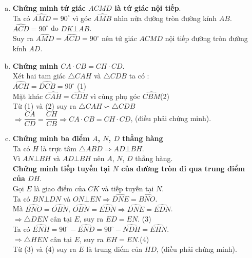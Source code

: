 \begin{ex}
{\begin{center}
		\end{center}
\begin{enumerate}[a)]
	\item \textbf{Chứng minh tứ giác $ACMD$ là tứ giác nội tiếp}.\\
	Ta có $ \widehat{AMD}= 90^\circ$ vì góc $\widehat{AMB}$ nhìn nửa đường tròn đường kính $AB$.\\
	$\widehat{ACD}=90^\circ$ do $DK \bot AB$.\\
	Suy ra $\widehat{AMD}=\widehat{ACD}=90^\circ$ nên
	tứ giác $ACMD$ nội tiếp đường tròn đường kính $AD$.
	\item \textbf{Chứng minh $CA \cdot CB=CH \cdot CD$}.\\
	Xét hai tam giác $\triangle CAH$ và $\triangle CDB$ ta có :\\
	$\widehat{ACH}=\widehat{DCB} =90^\circ $ \hfill (1)\\
	Mặt khác $\widehat{CAH}=\widehat{CDB}$ vì cùng phụ góc $\widehat{CBM}$\hfill (2)\\
	Từ (1) và (2) suy ra $\triangle CAH \backsim\triangle CDB$\\
	 $\Rightarrow \dfrac{CA}{CD}=\dfrac{CH}{CB}\Rightarrow CA\cdot CB = CH \cdot CD$, (điều phải chứng minh).
	 \item \textbf{Chứng minh ba điểm $A$, $N$, $D$ thẳng hàng}\\
	 Ta có $H$ là trực tâm $\triangle ABD \Rightarrow AD \bot BH$.\\
	 Vì $AN \bot BH$ và $AD \bot BH$ nên $A$, $N$, $D$ thẳng hàng.\\
	 \textbf{Chứng minh tiếp tuyến tại $N$ của đường tròn đi qua trung điểm của $DH$}.\\
	 Gọi $E$ là giao điểm của $CK$ và tiếp tuyến tại $N$.\\
	 Ta có $BN \bot DN$ và $ON \bot EN \Rightarrow \widehat{DNE} = \widehat{BNO}$.\\
	 Mà $\widehat{BNO} =\widehat{OBN}$, $\widehat{OBN} =\widehat{EDN}\Rightarrow \widehat {DNE} =\widehat{EDN}$.\\
	 $\Rightarrow \triangle DEN$ cân tại $E$, suy ra $ED=EN$. \hfill (3)\\
	 Ta có $\widehat{ENH}=90^\circ - \widehat{END}= 90^\circ -\widehat{NDH}= \widehat{EHN}$.\\ 
	 $\Rightarrow \triangle HEN$ cân tại $E$, suy ra $EH=EN$.\hfill (4)\\
	 Từ (3) và (4) suy ra $E$ là trung điểm của $HD$, (điều phải chứng minh).

\end{enumerate}}
\end{ex}

